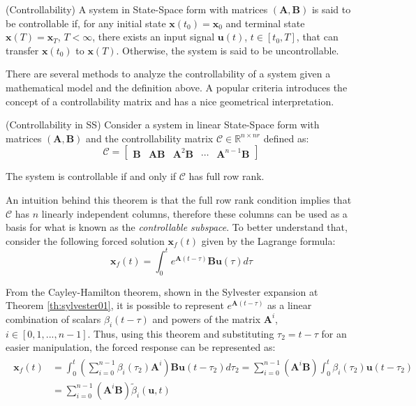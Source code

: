 \documentclass[a4paper,11pt]{book}
\numberwithin{figure}{chapter}
\numberwithin{equation}{chapter}
\numberwithin{table}{chapter}
\newtheorem{theorem}{Theorem}[chapter]
\theoremstyle{definition}
\newtheorem{definition}{Definition}[chapter]
\newcounter{boxed-theorem}
\newenvironment{boxed-theorem}[1]
{\begin{shaded} \begin{theorem}{#1}}
{\end{theorem} \end{shaded}}
\newcounter{boxed-definition}
\newenvironment{boxed-definition}[1]
{\begin{shaded} \begin{definition}{#1}}
{\end{definition} \end{shaded}}
\begin{document}
\begin{boxed-definition}{(Controllability)}
	A system in State-Space form with matrices $(\bm{A}, \bm{B})$ is said to be controllable if, for any initial state $\bm{x}(t_0) = \bm{x}_0$ and terminal state $\bm{x}(T) = \bm{x}_T$, $T < \infty$, there exists an input signal $\bm{u}(t)$, $t \in [t_0, T]$, that can transfer $\bm{x}(t_0)$ to $\bm{x}(T)$. Otherwise, the system is said to be uncontrollable. 
\end{boxed-definition}

There are several methods to analyze the controllability of a system given a mathematical model and the definition above. A popular criteria introduces the concept of a controllability matrix and has a nice geometrical interpretation.

\begin{boxed-theorem}{(Controllability in SS)}
	Consider a system in linear State-Space form with matrices $(\bm{A}, \bm{B})$ and the controllability matrix $\bm{\mathcal{C}} \in \mathbb{R}^{n \times nr}$ defined as:
	\begin{equation}
		\bm{\mathcal{C}} = \begin{bmatrix} \bm{B} & \bm{A} \bm{B} & \bm{A}^2 \bm{B} & \cdots & \bm{A}^{n-1} \bm{B} \end{bmatrix}
	\end{equation}
	
	\noindent The system is controllable if and only if $\bm{\mathcal{C}}$ has full row rank.
\end{boxed-theorem}   

An intuition behind this theorem is that the full row rank condition implies that $\mathcal{C}$ has $n$ linearly independent columns, therefore these columns can be used as a basis for what is known as the \textit{controllable subspace}. To better understand that, consider the following forced solution $\bm{x}_f(t)$ given by the Lagrange formula:
\begin{equation}
	\bm{x}_f(t) = \int_{0}^{t} e^{\bm{A} (t-\tau)} \bm{B} \bm{u}(\tau) d\tau
\end{equation}

From the Cayley-Hamilton theorem, shown in the Sylvester expansion at Theorem \ref{th:sylvester01}, it is possible to represent $e^{\bm{A}(t-\tau)}$ as a linear combination of scalars $\beta_i(t-\tau)$ and powers of the matrix $\bm{A}^i$, $i \in [0, 1,..., n-1]$. Thus, using this theorem and substituting $\tau_2 = t - \tau$ for an easier manipulation, the forced response can be represented as:
\begin{align}
\begin{split}
	\bm{x}_f(t) &= \int_{0}^{t} \left( \sum_{i=0}^{n-1} \beta_i(\tau_2) \bm{A}^i \right) \bm{B} \bm{u}(t - \tau_2) d\tau_2 = \sum_{i=0}^{n-1} \left( \bm{A}^i \bm{B} \right) \int_{0}^{t} \beta_i(\tau_2) \bm{u}(t - \tau_2)  \\
		&= \sum_{i=0}^{n-1} \left( \bm{A}^i \bm{B} \right) \tilde{\beta}_i(\bm{u}, t)
\end{split}
\end{align}
\end{document}
